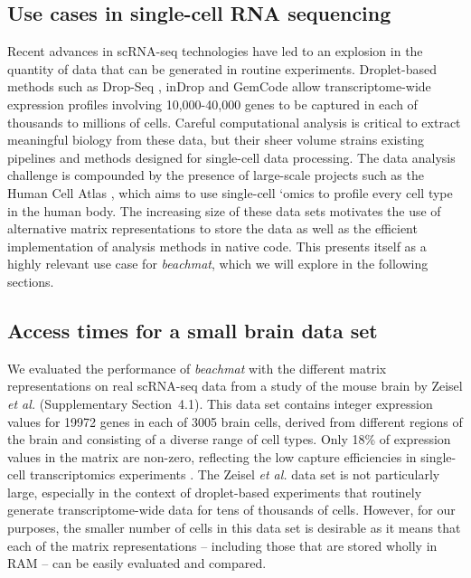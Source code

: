 \documentclass[10pt,letterpaper]{article}
\newcommand{\suppsecrealzeisel}{4.1}
\newcommand{\beachmat}{\textit{beachmat}}
\begin{document}
\subsection*{Use cases in single-cell RNA sequencing}
Recent advances in scRNA-seq technologies have led to an explosion in the quantity of data that can be generated in routine experiments.
Droplet-based methods such as Drop-Seq \cite{macosko2015highly}, inDrop \cite{klein2015droplet} and GemCode \cite{zheng2017massively} allow transcriptome-wide expression profiles involving 10,000-40,000 genes to be captured in each of thousands to millions of cells.
Careful computational analysis is critical to extract meaningful biology from these data, but their sheer volume strains existing pipelines and methods designed for single-cell data processing.
The data analysis challenge is compounded by the presence of large-scale projects such as the Human Cell Atlas \cite{regev2017human}, which aims to use single-cell `omics to profile every cell type in the human body.
The increasing size of these data sets motivates the use of alternative matrix representations to store the data as well as the efficient implementation of analysis methods in native code.
This presents itself as a highly relevant use case for \beachmat{}, which we will explore in the following sections.

\subsection*{Access times for a small brain data set}
We evaluated the performance of \beachmat{} with the different matrix representations on real scRNA-seq data from a study of the mouse brain by Zeisel \textit{et al.} \cite{zeisel2015brain} (Supplementary Section~\suppsecrealzeisel{}). 
This data set contains integer expression values for 19972 genes in each of 3005 brain cells, derived from different regions of the brain and consisting of a diverse range of cell types.
Only 18\% of expression values in the matrix are non-zero, reflecting the low capture efficiencies in single-cell transcriptomics experiments \cite{grun2015design}.
The Zeisel \textit{et al.} data set is not particularly large, especially in the context of droplet-based experiments that routinely generate transcriptome-wide data for tens of thousands of cells.
However, for our purposes, the smaller number of cells in this data set is desirable as it means that each of the matrix representations -- including those that are stored wholly in RAM -- can be easily evaluated and compared.
\end{document}
